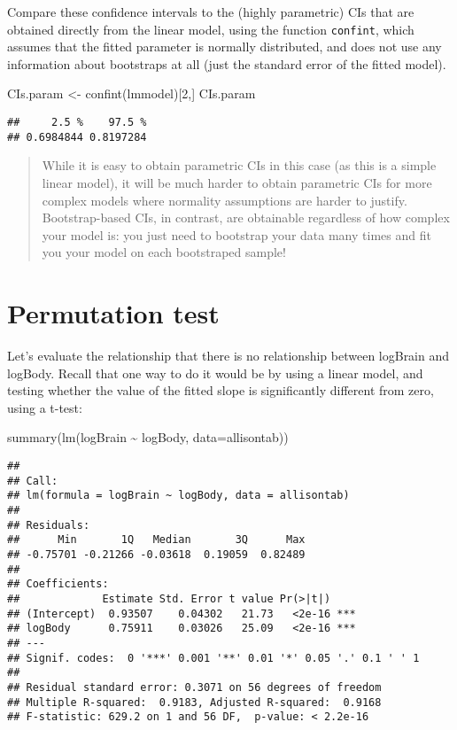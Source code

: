 \documentclass[
]{book}
\newenvironment{Shaded}{\begin{snugshade}}{\end{snugshade}}
\newcommand{\AttributeTok}[1]{\textcolor[rgb]{0.77,0.63,0.00}{#1}}
\newcommand{\DecValTok}[1]{\textcolor[rgb]{0.00,0.00,0.81}{#1}}
\newcommand{\FunctionTok}[1]{\textcolor[rgb]{0.00,0.00,0.00}{#1}}
\newcommand{\NormalTok}[1]{#1}
\newcommand{\OtherTok}[1]{\textcolor[rgb]{0.56,0.35,0.01}{#1}}
\newcommand{\SpecialCharTok}[1]{\textcolor[rgb]{0.00,0.00,0.00}{#1}}
\begin{document}
Compare these confidence intervals to the (highly parametric) CIs that are obtained directly from the linear model, using the function \texttt{confint}, which assumes that the fitted parameter is normally distributed, and does not use any information about bootstraps at all (just the standard error of the fitted model).

\begin{Shaded}
\begin{Highlighting}[]
\NormalTok{CIs.param }\OtherTok{\textless{}{-}} \FunctionTok{confint}\NormalTok{(lmmodel)[}\DecValTok{2}\NormalTok{,]}
\NormalTok{CIs.param}
\end{Highlighting}
\end{Shaded}

\begin{verbatim}
##     2.5 %    97.5 % 
## 0.6984844 0.8197284
\end{verbatim}

\begin{quote}
While it is easy to obtain parametric CIs in this case (as this is a simple linear model), it will be much harder to obtain parametric CIs for more complex models where normality assumptions are harder to justify. Bootstrap-based CIs, in contrast, are obtainable regardless of how complex your model is: you just need to bootstrap your data many times and fit you your model on each bootstraped sample!
\end{quote}

\hypertarget{permutation-test}{%
\section{Permutation test}\label{permutation-test}}

Let's evaluate the relationship that there is no relationship between logBrain and logBody. Recall that one way to do it would be by using a linear model, and testing whether the value of the fitted slope is significantly different from zero, using a t-test:

\begin{Shaded}
\begin{Highlighting}[]
\FunctionTok{summary}\NormalTok{(}\FunctionTok{lm}\NormalTok{(logBrain }\SpecialCharTok{\textasciitilde{}}\NormalTok{ logBody, }\AttributeTok{data=}\NormalTok{allisontab))}
\end{Highlighting}
\end{Shaded}

\begin{verbatim}
## 
## Call:
## lm(formula = logBrain ~ logBody, data = allisontab)
## 
## Residuals:
##      Min       1Q   Median       3Q      Max 
## -0.75701 -0.21266 -0.03618  0.19059  0.82489 
## 
## Coefficients:
##             Estimate Std. Error t value Pr(>|t|)    
## (Intercept)  0.93507    0.04302   21.73   <2e-16 ***
## logBody      0.75911    0.03026   25.09   <2e-16 ***
## ---
## Signif. codes:  0 '***' 0.001 '**' 0.01 '*' 0.05 '.' 0.1 ' ' 1
## 
## Residual standard error: 0.3071 on 56 degrees of freedom
## Multiple R-squared:  0.9183, Adjusted R-squared:  0.9168 
## F-statistic: 629.2 on 1 and 56 DF,  p-value: < 2.2e-16
\end{verbatim}
\end{document}

